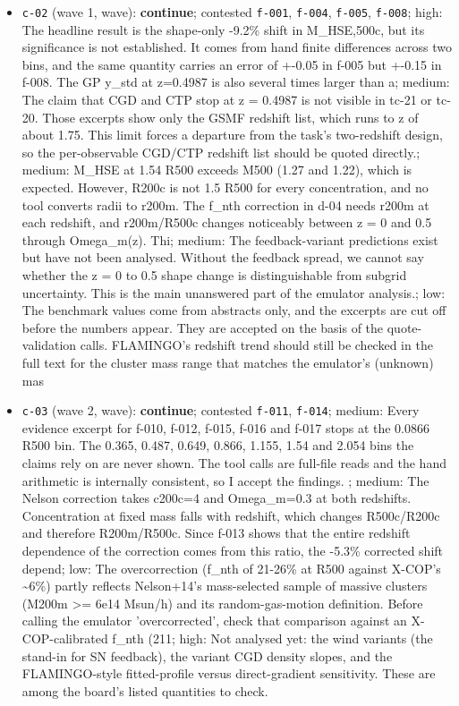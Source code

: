 \documentclass[11pt,a4paper]{article}
\begin{document}
\begin{itemize}
  \item \texttt{c-02} (wave 1, wave): \textbf{continue}; contested \texttt{f-001}, \texttt{f-004}, \texttt{f-005}, \texttt{f-008}; high: The headline result is the shape-only -9.2\% shift in M\_HSE,500c, but its significance is not established. It comes from hand finite differences across two bins, and the same quantity carries an error of +-0.05 in f-005 but +-0.15 in f-008. The GP y\_std at z=0.4987 is also several times larger than a; medium: The claim that CGD and CTP stop at z = 0.4987 is not visible in tc-21 or tc-20. Those excerpts show only the GSMF redshift list, which runs to z of about 1.75. This limit forces a departure from the task's two-redshift design, so the per-observable CGD/CTP redshift list should be quoted directly.; medium: M\_HSE at 1.54 R500 exceeds M500 (1.27 and 1.22), which is expected. However, R200c is not 1.5 R500 for every concentration, and no tool converts radii to r200m. The f\_nth correction in d-04 needs r200m at each redshift, and r200m/R500c changes noticeably between z = 0 and 0.5 through Omega\_m(z). Thi; medium: The feedback-variant predictions exist but have not been analysed. Without the feedback spread, we cannot say whether the z = 0 to 0.5 shape change is distinguishable from subgrid uncertainty. This is the main unanswered part of the emulator analysis.; low: The benchmark values come from abstracts only, and the excerpts are cut off before the numbers appear. They are accepted on the basis of the quote-validation calls. FLAMINGO's redshift trend should still be checked in the full text for the cluster mass range that matches the emulator's (unknown) mas
  \item \texttt{c-03} (wave 2, wave): \textbf{continue}; contested \texttt{f-011}, \texttt{f-014}; medium: Every evidence excerpt for f-010, f-012, f-015, f-016 and f-017 stops at the 0.0866 R500 bin. The 0.365, 0.487, 0.649, 0.866, 1.155, 1.54 and 2.054 bins the claims rely on are never shown. The tool calls are full-file reads and the hand arithmetic is internally consistent, so I accept the findings. ; medium: The Nelson correction takes c200c=4 and Omega\_m=0.3 at both redshifts. Concentration at fixed mass falls with redshift, which changes R500c/R200c and therefore R200m/R500c. Since f-013 shows that the entire redshift dependence of the correction comes from this ratio, the -5.3\% corrected shift depend; low: The overcorrection (f\_nth of 21-26\% at R500 against X-COP's \textasciitilde{}6\%) partly reflects Nelson+14's mass-selected sample of massive clusters (M200m \textgreater{}= 6e14 Msun/h) and its random-gas-motion definition. Before calling the emulator 'overcorrected', check that comparison against an X-COP-calibrated f\_nth (211; high: Not analysed yet: the wind variants (the stand-in for SN feedback), the variant CGD density slopes, and the FLAMINGO-style fitted-profile versus direct-gradient sensitivity. These are among the board's listed quantities to check.

\end{itemize}
\end{document}

